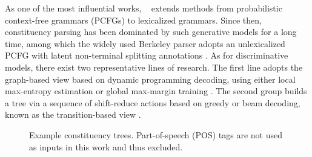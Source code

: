 \documentclass{article}
\begin{document}
As one of the most influential works, \citeauthor{collins-1997-three}~ extends methods from probabilistic context-free grammars (PCFGs) to lexicalized grammars.
Since then, constituency parsing has been dominated by such generative models for a long time, among which
the widely used Berkeley parser adopts an unlexicalized PCFG with latent non-terminal splitting annotations \cite{matsuzaki-etal-2005-probabilistic,petrov-klein-2007-improved}.
As for discriminative models, there exist two representative lines of research.
The first line adopts the graph-based view based on dynamic programming decoding, using either local max-entropy estimation \cite{kaplan-etal-2004-speed} or global max-margin training \cite{taskar-etal-2004-max}.
The second group builds a tree via a sequence of shift-reduce actions based on greedy or beam decoding, known as the transition-based view \cite{sagae-lavie-2005-classifier,zhu-etal-2013-fast}.








\begin{figure}[tb]
\hfill
{}
\caption{
    Example constituency trees. Part-of-speech (POS) tags are not used  as inputs in this work and thus excluded.
}
\label{fig:const-tree-full-figure}
\end{figure}
 
\end{document}
